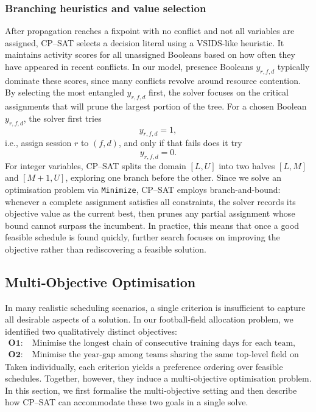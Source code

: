 \documentclass[12pt]{article}
\begin{document}
\subsubsection*{Branching heuristics and value selection}
After propagation reaches a fixpoint with no conflict and not all variables are assigned, CP–SAT selects a decision literal using a VSIDS-like heuristic. It maintains activity scores for all unassigned Booleans based on how often they have appeared in recent conflicts. In our model, presence Booleans \(y_{r,f,d}\) typically dominate these scores, since many conflicts revolve around resource contention. By selecting the most entangled \(y_{r,f,d}\) first, the solver focuses on the critical assignments that will prune the largest portion of the tree. For a chosen Boolean \(y_{r,f,d}\), the solver first tries
\[
  y_{r,f,d} = 1,
\]
i.e., assign session \(r\) to \((f,d)\), and only if that fails does it try
\[
  y_{r,f,d} = 0.
\]
For integer variables, CP–SAT splits the domain \([L,U]\) into two halves \([L,M]\) and \([M+1,U]\), exploring one branch before the other. Since we solve an optimisation problem via \texttt{Minimize}, CP–SAT employs branch-and-bound: whenever a complete assignment satisfies all constraints, the solver records its objective value as the current best, then prunes any partial assignment whose bound cannot surpass the incumbent. In practice, this means that once a good feasible schedule is found quickly, further search focuses on improving the objective rather than rediscovering a feasible solution.


\subsection{Multi‐Objective Optimisation}

In many realistic scheduling scenarios, a single criterion is insufficient to capture all desirable aspects of a solution. In our football‐field allocation problem, we identified two qualitatively distinct objectives:
\[
\begin{aligned}
\textbf{O1:}\;& \text{Minimise the longest chain of consecutive training days for each team, then sum over all teams;}\\
\textbf{O2:}\;& \text{Minimise the year‐gap among teams sharing the same top‐level field on the same day.}
\end{aligned}
\]
Taken individually, each criterion yields a preference ordering over feasible schedules. Together, however, they induce a multi‐objective optimisation problem. In this section, we first formalise the multi‐objective setting and then describe how CP–SAT can accommodate these two goals in a single solve.
\end{document}

